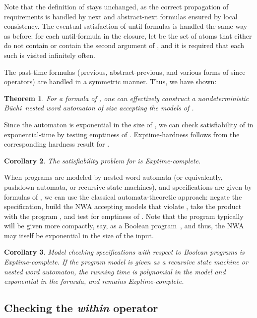 \documentclass{LMCS}
\theoremstyle{plain}
\newtheorem{theorem}{Theorem}[section]
\newtheorem{corollary}[theorem]{Corollary}
\theoremstyle{definition}
\newcommand{\EXPTIME}{{\sc Exptime}}
\def\buchi{B\"{u}chi}
\begin{document}
\noindent Note that the definition of  stays unchanged, as
the correct propagation of requirements is handled by next and
abstract-next formulas ensured by local consistency. The eventual
satisfaction of until formulas is handled the same way as before: for
each until-formula  in the closure, let  be the set of
atoms that either do not contain  or contain the second argument
of , and it is required that each such  is visited
infinitely often.

The past-time formulas (previous, abstract-previous, and various forms of since
operators) are handled in a symmetric manner.
Thus, we have shown:

\begin{theorem}\label{exp-buchi}
For a formula  of ,
one can effectively construct a nondeterministic \buchi\ nested word automaton 
of size  accepting 
the models of .
\end{theorem}

Since the automaton  is exponential in the size of , we
can check satisfiability of  in exponential-time by testing emptiness
of . \EXPTIME-hardness follows from the corresponding hardness result for
.

\begin{corollary}
The satisfiability problem for  is \EXPTIME-complete.
\end{corollary}

When programs are modeled by nested word automata  (or
equivalently, pushdown automata, or recursive state machines), and
specifications are given by formulas  of  , 
we can use the classical automata-theoretic approach:
negate the specification, build the NWA  accepting
models that violate , take the product with the program
, and test for emptiness of .  Note
that the program typically will be given more compactly, say, as a
Boolean program~\cite{BallRajamani}, and thus, the NWA  may itself
be exponential in the size of the input.

\begin{corollary}
Model checking  specifications with respect to Boolean programs
is \EXPTIME-complete.  If the program model is given as a recursive
state machine or nested word automaton, the running time is
polynomial in the model and exponential in the  formula,
and remains \EXPTIME-complete.
\end{corollary}

\subsection{Checking the {\em within} operator}
\end{document}
